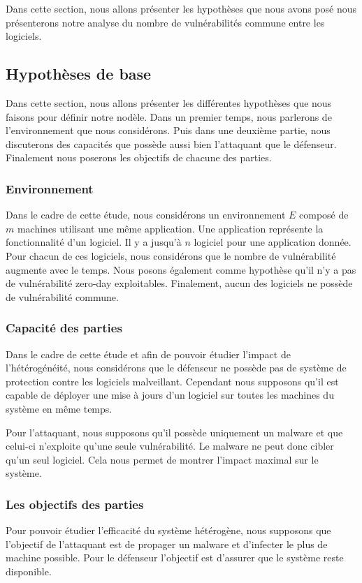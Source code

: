 Dans cette section, nous allons présenter les hypothèses que nous avons posé nous présenterons notre analyse du nombre de vulnérabilités commune entre les logiciels.

\subsection{Hypothèses de base}\label{sec:hypothese}
Dans cette  section, nous allons présenter les différentes hypothèses que nous faisons pour définir notre nodèle.
Dans un premier temps, nous parlerons de l'environnement que nous considérons.
Puis dans une deuxième partie, nous discuterons des capacités que possède aussi bien l'attaquant que le défenseur.
Finalement nous poserons les objectifs de chacune des parties.

\subsubsection{Environnement}\label{sec:hypothese:env}
Dans le cadre de cette étude, nous considérons un environnement $E$ composé de $m$ machines utilisant une même application.
Une application représente la fonctionnalité d'un logiciel.
Il y a jusqu'à $n$ logiciel pour une application donnée.
Pour chacun de ces logiciels, nous considérons que le nombre de vulnérabilité augmente avec le temps.
Nous posons également comme hypothèse qu'il n'y a pas de vulnérabilité zero-day exploitables.
Finalement, aucun des logiciels ne possède de vulnérabilité commune.


\subsubsection{Capacité des parties}\label{sec:hypothese:capacite}
Dans le cadre de cette étude et afin de pouvoir étudier l'impact de l'hétérogénéité,  nous considérons que le défenseur ne possède pas de système de protection contre les logiciels malveillant.
Cependant nous supposons qu'il est capable de déployer une mise à jours d'un logiciel sur toutes les machines du système en même temps.

Pour l'attaquant, nous supposons qu'il possède uniquement un malware et que celui-ci n'exploite qu'une seule vulnérabilité.
Le malware ne peut donc cibler qu'un seul logiciel.
Cela nous permet de montrer l'impact maximal sur le système.


\subsubsection{Les objectifs des parties}\label{sec:hypothese:objectifs}
Pour pouvoir étudier l'efficacité du système hétérogène, nous supposons que l'objectif de l'attaquant est de propager un malware et d'infecter le plus de machine possible.
Pour le défenseur l'objectif est d'assurer que le système reste disponible.


